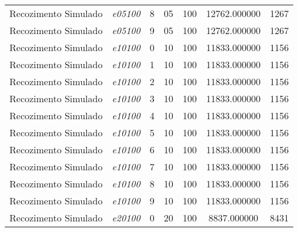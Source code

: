 {\begin{longtable}{cc|c|cc|cc}
			Recozimento Simulado & \textit{e05100}    & 8                               & 05               & 100              & 12762.000000                          & 1267 \\ 
			Recozimento Simulado & \textit{e05100}    & 9                               & 05               & 100              & 12762.000000                          & 1267 \\ \hline
			Recozimento Simulado & \textit{e10100}    & 0                               & 10               & 100              & 11833.000000                          & 1156 \\ 
			Recozimento Simulado & \textit{e10100}    & 1                               & 10               & 100              & 11833.000000                          & 1156 \\ 
			Recozimento Simulado & \textit{e10100}    & 2                               & 10               & 100              & 11833.000000                          & 1156 \\ 
			Recozimento Simulado & \textit{e10100}    & 3                               & 10               & 100              & 11833.000000                          & 1156 \\ 
			Recozimento Simulado & \textit{e10100}    & 4                               & 10               & 100              & 11833.000000                          & 1156 \\ 
			Recozimento Simulado & \textit{e10100}    & 5                               & 10               & 100              & 11833.000000                          & 1156 \\ 
			Recozimento Simulado & \textit{e10100}    & 6                               & 10               & 100              & 11833.000000                          & 1156 \\ 
			Recozimento Simulado & \textit{e10100}    & 7                               & 10               & 100              & 11833.000000                          & 1156 \\ 
			Recozimento Simulado & \textit{e10100}    & 8                               & 10               & 100              & 11833.000000                          & 1156 \\ 
			Recozimento Simulado & \textit{e10100}    & 9                               & 10               & 100              & 11833.000000                          & 1156 \\ \hline
			Recozimento Simulado & \textit{e20100}    & 0                               & 20               & 100              & 8837.000000                          & 8431 \\ 

\end{longtable}}
